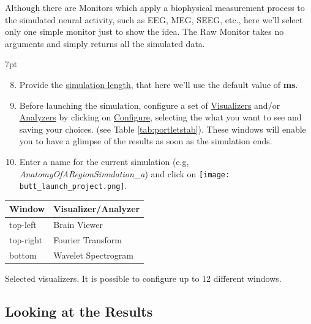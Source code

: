 \documentclass{tufte-handout}
\newenvironment{simulation}{%
  \def\FrameCommand{%
    \hspace{1pt}%
    {\color{ForestGreen}\vrule width 2pt}%
    {\color{simulationshade}\vrule width 4pt}%
    \colorbox{simulationshade}%
  }%
  \MakeFramed{\advance\hsize-\width\FrameRestore}%
  \noindent\hspace{-4.55pt}%
  \begin{adjustwidth}{}{7pt}%
  \vspace{2pt}\vspace{2pt}%
}
{%
  \vspace{2pt}\end{adjustwidth}\endMakeFramed%
}
\begin{document}
Although there are Monitors which apply a biophysical measurement process to
the simulated neural activity, such as EEG, MEG, SEEG, etc.,  here we'll select only
one simple monitor just to show the idea. The Raw Monitor takes no arguments
and simply returns all the simulated data. 


\begin{simulation}
\begin{enumerate}[resume]
  \setcounter{enumi}{7}
 \item Provide the \underline{simulation length}, that here we'll use the default value of \textbf{\unit[1000]{ms}}.
 \item Before launching the simulation, configure a set of \underline{Visualizers} and/or \underline{Analyzers} by clicking on \underline{Configure}, selecting the what you want to see and saving your choices. (see Table \ref{tab:portletstab}). These windows will enable you to have a glimpse of the results as soon as the simulation ends. 
 \item Enter a name for the current simulation (e.g, \textit{AnatomyOfARegionSimulation\_a}) and click on  \texttt{[image: butt\_launch\_project.png]}.
\end{enumerate}
\end{simulation}

\begin{margintable}
  \centering
  \selectfont
  \begin{tabular}{ll}
    \toprule
    Window & Visualizer/Analyzer \\
    \midrule
             top-left        &   Brain Viewer\\
             top-right    &   Fourier Transform        \\
             bottom   &   Wavelet Spectrogram \\
    \bottomrule
  \end{tabular}
  \caption{Selected visualizers. It is possible to configure up to 12 different windows. }
  \label{tab:portletstab}
\end{margintable}


\subsection{Looking at the Results}\label{sec:results}
\end{document}
